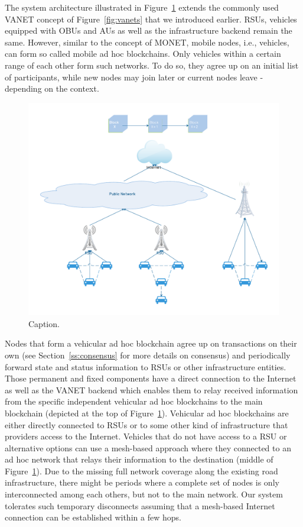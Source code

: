 \documentclass{llncs}
\begin{document}
{			The system architecture illustrated in Figure~\ref{fig:architecture-overview} extends the commonly used VANET concept of Figure~\ref{fig:vanets} that we introduced earlier. RSUs, vehicles equipped with OBUs and AUs as well as the infrastructure backend remain the same. However, similar to the concept of MONET, mobile nodes, i.e., vehicles, can form so called mobile ad hoc blockchains. Only vehicles within a certain range of each other form such networks. To do so, they agree up on an initial list of participants, while new nodes may join later or current nodes leave - depending on the context.		
			\begin{figure}[H]
				\centering
				\includegraphics[scale=0.5]{Figures/20180904_monet-vanet.pdf}
				\caption{Caption.}
				\label{fig:architecture-overview}
			\end{figure}
			Nodes that form a vehicular ad hoc blockchain agree up on transactions on their own (see Section~\ref{ss:consensus} for more details on consensus) and periodically forward state and status information to RSUs or other infrastructure entities. Those permanent and fixed components have a direct connection to the Internet as well as the VANET backend which enables them to relay received information from the specific independent vehicular ad hoc blockchains to the main blockchain (depicted at the top of Figure~\ref{fig:architecture-overview}). Vehicular ad hoc blockchains are either directly connected to RSUs or to some other kind of infrastructure that providers access to the Internet. Vehicles that do not have access to a RSU or alternative options can use a mesh-based approach where they connected to an ad hoc network that relays their information to the destination (middle of Figure~\ref{fig:architecture-overview}). Due to the missing full network coverage along the existing road infrastructure, there might be periods where a complete set of nodes is only interconnected among each others, but not to the main network. Our system tolerates such temporary disconnects assuming that a mesh-based Internet connection can be established within a few hops.

}
\end{document}
